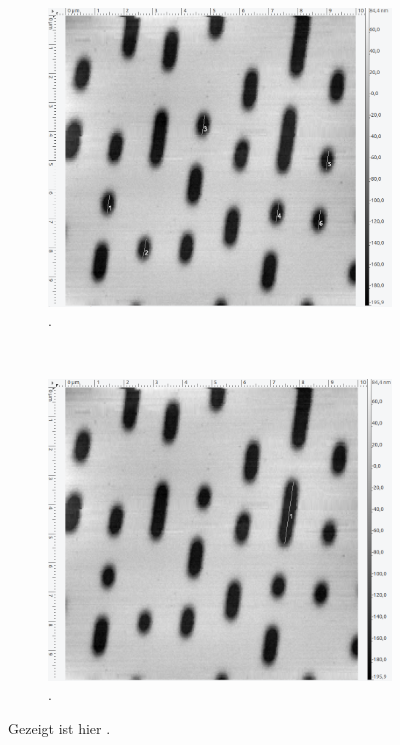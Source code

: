 \begin{figure}[H]
\begin{subfigure}[t]{0.4\textwidth}
	\label{abb:}
	\end{subfigure}
	\\
	\begin{subfigure}[t]{0.4\textwidth}
	\includegraphics[width=\textwidth]{AFM_auswertung/cd_Lmin.png}
	\caption{.}
	\label{abb:}
	\end{subfigure}
	~
	\begin{subfigure}[t]{0.4\textwidth}
	\includegraphics[width=\textwidth]{AFM_auswertung/cd_Lmax.png}
	\caption{.}
	\label{abb:}
	\end{subfigure}
\caption{Gezeigt ist hier .}
\label{abb:CD}
\end{figure}

